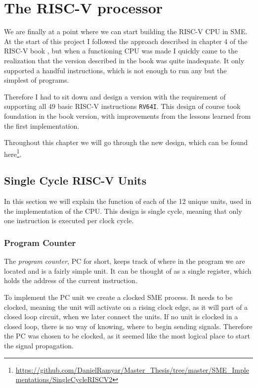 \chapter{The RISC-V processor}\label{Chapter:5}
    We are finally at a point where we can start building the RISC-V CPU in SME. At the start of this project I followed the approach described in chapter 4 of the RISC-V book \cite{riscVbook}, but when a functioning CPU was made I quickly came to the realization that the version described in the book was quite inadequate. It only supported a handful instructions, which is not enough to run any but the simplest of programs. 
    
    Therefore I had to sit down and design a version with the requirement of supporting all 49 basic RISC-V instructions \texttt{RV64I}. This design of course took foundation in the book version, with improvements from the lessons learned from the first implementation.
    
    Throughout this chapter we will go through the new design, which can be found here\footnote{\url{https://github.com/DanielRamyar/Master_Thesis/tree/master/SME_Implementations/SingleCycleRISCV2}}.

\section{Single Cycle RISC-V Units}\label{section:riscunits}
    In this section we will explain the function of each of the 12 unique units, used in the implementation of the CPU. This design is single cycle, meaning that only one instruction is executed per clock cycle. 

    \subsection{Program Counter}
        The \textit{program counter}, PC for short, keeps track of where in the program we are located and is a fairly simple unit. It can be thought of as a single register, which holds the address of the current instruction.
        
        To implement the PC unit we create a clocked SME process. It needs to be clocked, meaning the unit will activate on a rising clock edge, as it will part of a closed loop circuit, when we later connect the units. If no unit is clocked in a closed loop, there is no way of knowing, where to begin sending signals. Therefore the PC was chosen to be clocked, as it seemed like the most logical place to start the signal propagation.
        
